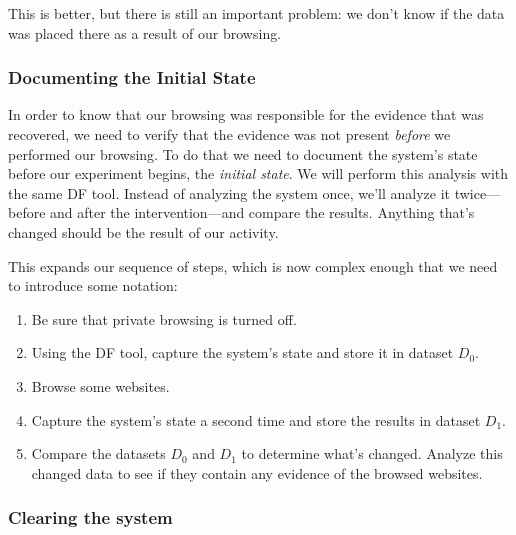 This is better, but there is still an important problem: we don't know
if the data was placed there as a result of our browsing.

\subsubsection{Documenting the Initial State}
In order to know that our browsing was responsible for the evidence
that was recovered, we need to verify that the evidence was not
present \emph{before} we performed our browsing. To do that we need to
document the system's state before our experiment
begins, the \emph{initial state}. We will perform this analysis with
the same DF tool. Instead of analyzing the system once, we'll analyze it
twice---before and after the intervention---and compare the
results. Anything that's changed should be the result of our activity.

This expands our sequence of steps, which is now complex enough that
we need to introduce some notation:


\begin{enumerate}
\item Be sure that private browsing is turned off.
\item Using the DF tool, capture the system's state and store it in dataset $D_0$.
\item Browse some websites.
\item Capture the system's state a second time and store the results in dataset $D_1$.
\item Compare the datasets $D_0$ and $D_1$ to determine what's
  changed. Analyze this changed data to see if they contain any
  evidence of the browsed websites. 
\end{enumerate}

\subsubsection{Clearing the system}

